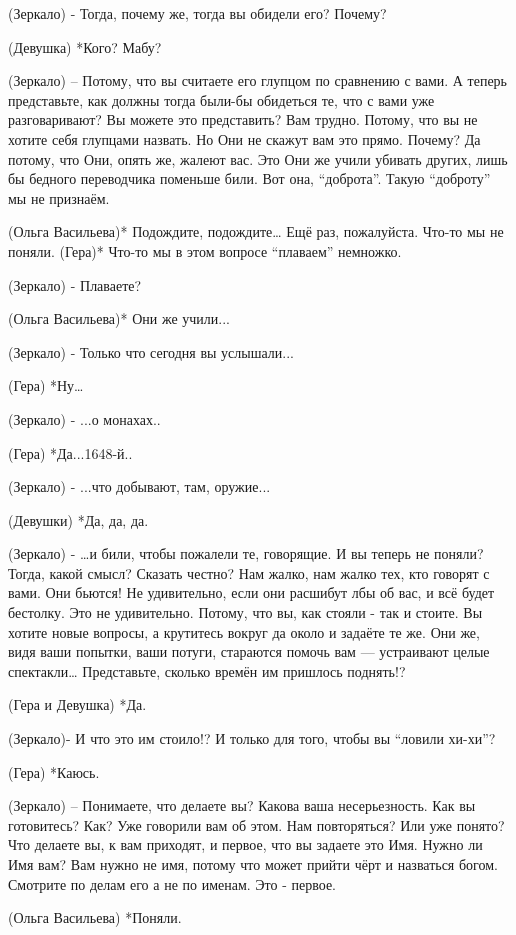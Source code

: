 (Зеркало) - Тогда, почему же, тогда вы обидели его? Почему?

(Девушка) *Кого? Мабу?

(Зеркало) – Потому, что вы считаете его глупцом по сравнению с вами. А теперь представьте, как должны тогда были-бы обидеться те, что с вами уже разговаривают? Вы можете это представить? Вам трудно. Потому, что вы не хотите себя глупцами назвать. Но Они не скажут вам это прямо. Почему? Да потому, что Они, опять же, жалеют вас. Это Они же  учили убивать других, лишь бы бедного переводчика поменьше били. Вот она, “доброта”. Такую “доброту” мы не признаём.

(Ольга Васильева)* Подождите, подождите… Ещё раз, пожалуйста. Что-то мы не поняли.
(Гера)* Что-то мы в этом вопросе  “плаваем” немножко.

(Зеркало) -  Плаваете?

(Ольга Васильева)* Они же учили...

(Зеркало) - Только что сегодня вы услышали... 

(Гера) *Ну… 

(Зеркало) - ...о монахах..

(Гера) *Да...1648-й.. 

(Зеркало) - ...что добывают, там, оружие...

(Девушки) *Да, да, да.

(Зеркало)  - …и били, чтобы пожалели те, говорящие. И вы теперь не поняли? Тогда, какой смысл? Сказать честно? Нам жалко, нам жалко тех, кто говорят с вами. Они бьются! Не удивительно, если они расшибут лбы об вас, и всё будет бестолку. Это не удивительно. Потому, что вы, как стояли - так и стоите. Вы хотите новые вопросы, а крутитесь вокруг да около и задаёте те же. Они же, видя ваши попытки, ваши потуги, стараются помочь вам — устраивают целые спектакли… Представьте, сколько времён им пришлось поднять!?

(Гера и Девушка) *Да.

(Зеркало)-  И что это им стоило!? И только для того, чтобы вы “ловили хи-хи”? 

(Гера) *Каюсь.

(Зеркало) – Понимаете, что делаете вы? Какова ваша несерьезность. Как вы готовитесь? Как? Уже говорили вам об этом. Нам повторяться? Или уже понято? Что делаете вы, к вам приходят, и первое, что вы задаете это Имя. Нужно ли Имя вам? Вам нужно не имя, потому что может прийти чёрт и назваться богом. Смотрите по делам его а не по именам. Это - первое. 

(Ольга Васильева) *Поняли.

